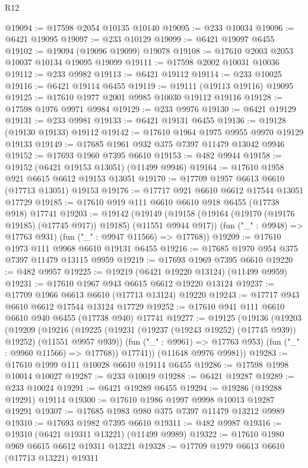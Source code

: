 \begin{lexlean}{R12}
\begin{coremodule}
{{{{{{{{{{{{{{{{{{{{{{{{{{{{{{{{{{{{{{{{{{{{{{{{{{{{{{{{{{{{{{{{{{{{{{{{{{{{{{{{{{@19094 := @17598 @2054 @10135 @10140
@19095 := @233 @10034
@19096 := @6421 @19095
@19097 := @233 @10129
@19099 := @6421 @19097 @6455
@19102 := @19094 (@19096 @19099) @19078
@19108 := @17610 @2003 @2053 @10037 @10134 @19095 @19099
@19111 := @17598 @2002 @10031 @10036
@19112 := @233 @9982
@19113 := @6421 @19112
@19114 := @233 @10025
@19116 := @6421 @19114 @6455
@19119 := @19111 (@19113 @19116) @19095
@19125 := @17610 @1977 @2001 @9985 @10030 @19112 @19116
@19128 := @17598 @1976 @9971 @9984
@19129 := @233 @9976
@19130 := @6421 @19129
@19131 := @233 @9981
@19133 := @6421 @19131 @6455
@19136 := @19128 (@19130 @19133) @19112
@19142 := @17610 @1964 @1975 @9955 @9970 @19129 @19133
@19149 := @17685 @1961 @932 @375 @7397 @11479 @13042 @9946
@19152 := @17693 @1960 @7395 @6610
@19153 := @482 @9944
@19158 := @19152 (@6421 @19153 @13051) (@11499 @9946)
@19164 := @17610 @1958 @921 @6615 @6612 @19153 @13051
@19170 := @17709 @1957 @6613 @6610 (@17713 @13051) @19153
@19176 := @17717 @921 @6610 @6612 @17544 @13051 @17729
@19185 := @17610 @919 @111 @6610 @6610 @918 @6455 (@17738 @918) @17741
@19203 := @19142
    (@19149
      (@19158 (@19164 (@19170 (@19176 @19185) (@17745 @917)) @19185) (@11551 @9944 @917))
      (fun ("_" : @9948) => @17763 @931)
      (fun ("_" : @9947 @11566) => @17768))
@19209 := @17610 @1973 @111 @9968 @6610 @19131 @6455
@19216 := @17685 @1970 @954 @375 @7397 @11479 @13115 @9959
@19219 := @17693 @1969 @7395 @6610
@19220 := @482 @9957
@19225 := @19219 (@6421 @19220 @13124) (@11499 @9959)
@19231 := @17610 @1967 @943 @6615 @6612 @19220 @13124
@19237 := @17709 @1966 @6613 @6610 (@17713 @13124) @19220
@19243 := @17717 @943 @6610 @6612 @17544 @13124 @17729
@19252 := @17610 @941 @111 @6610 @6610 @940 @6455 (@17738 @940) @17741
@19277 := @19125
    (@19136
      (@19203
        (@19209
          (@19216
            (@19225 (@19231 (@19237 (@19243 @19252) (@17745 @939)) @19252) (@11551 @9957 @939))
            (fun ("_" : @9961) => @17763 @953)
            (fun ("_" : @9960 @11566) => @17768))
          @17741))
      (@11648 @9976 @9981))
@19283 := @17610 @1999 @111 @10028 @6610 @19114 @6455
@19286 := @17598 @1998 @10014 @10027
@19287 := @233 @10019
@19288 := @6421 @19287
@19289 := @233 @10024
@19291 := @6421 @19289 @6455
@19294 := @19286 (@19288 @19291) @19114
@19300 := @17610 @1986 @1997 @9998 @10013 @19287 @19291
@19307 := @17685 @1983 @980 @375 @7397 @11479 @13212 @9989
@19310 := @17693 @1982 @7395 @6610
@19311 := @482 @9987
@19316 := @19310 (@6421 @19311 @13221) (@11499 @9989)
@19322 := @17610 @1980 @969 @6615 @6612 @19311 @13221
@19328 := @17709 @1979 @6613 @6610 (@17713 @13221) @19311
}}}}}}}}}}}}}}}}}}}}}}}}}}}}}}}}}}}}}}}}}}}}}}}}}}}}}}}}}}}}}}}}}}}}}}}}}}}}}}}}}}
\end{coremodule}
\end{lexlean}

